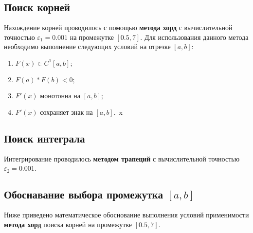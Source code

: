 \documentclass[a4paper,12pt,titlepage,finall]{article}
\begin{document}
\subsection{Поиск корней}

Нахождение корней проводилось с помощью \textbf{метода хорд} с вычислительной точностью $\varepsilon_1=0.001$ на промежутке $[0.5, 7]$.
Для использования данного метода необходимо выполнение следующих условий на отрезке $[a, b]$:

\begin{enumerate}
    \item $F(x)\in C^1[a, b]$;
    \item $F(a)*F(b) < 0$;
    \item $F'(x)$ монотонна на $[a, b]$;
    \item $F'(x)$ сохраняет знак на $[a, b]$.~x\cite{math}
\end{enumerate}

\subsection{Поиск интеграла}

Интегрирование проводилось \textbf{методом трапеций} с вычислительной точностью $\varepsilon_2=0.001$.

\newpage

\subsection{Обоснавание выбора промежутка $[a, b]$}

Ниже приведено математическое обоснование выполнения условий применимости \textbf{метода хорд} поиска корней на промежутке $[0.5, 7]$.
\end{document}
